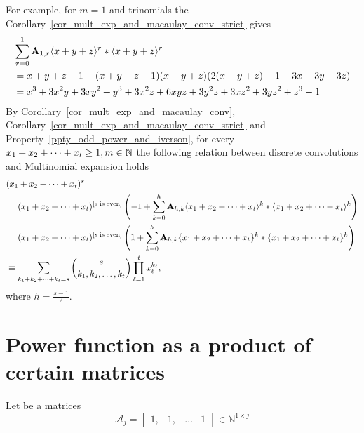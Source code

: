 \documentclass[12pt,letterpaper,oneside,reqno]{amsart}
\newcommand \anglePower [2]{\langle #1 \rangle \sp{#2}}
\newcommand \multifoldSum [2][x]{{#1}\sb{1} + {#1}\sb{2} + \cdots + {#1}\sb{#2}}
\newcommand \curvePower [2]{\{#1\}\sp{#2}}
\newcommand \iversonBracket [1][s]{[#1 \; \mathrm{is} \; \mathrm{even}]}
\newcommand \coeffA [3][A] {{\mathbf{#1}} \sb{#2,#3}}
\numberwithin{equation}{section}
\begin{document}
    For example, for $m=1$ and trinomials the Corollary~\ref{cor_mult_exp_and_macaulay_conv_strict} gives
    \begin{equation*}
        \begin{split}
            &\sum_{r=0}^{1} \coeffA{1}{r} \anglePower{x+y+z}{r} \ast \anglePower{x+y+z}{r} \\
            &=x + y + z -1 - (x + y + z -1) (x + y + z) (2 (x + y + z) - 1 - 3 x - 3 y - 3 z) \\
            &=x^3 + 3 x^2 y + 3 x y^2 + y^3 + 3 x^2 z + 6 x y z + 3 y^2 z + 3 x z^2 + 3 y z^2 + z^3-1
        \end{split}
    \end{equation*}
    By Corollary~\ref{cor_mult_exp_and_macaulay_conv}, Corollary~\ref{cor_mult_exp_and_macaulay_conv_strict}
    and Property~\ref{ppty_odd_power_and_iverson}, for every $\multifoldSum{t} \geq 1, m\in\mathbb{N}$
    the following relation between discrete convolutions and Multinomial expansion holds
    \begin{equation*}
        \begin{split}
            &(\multifoldSum{t})^s \\
            &=(\multifoldSum{t})^{\iversonBracket}
            \left(-1 + \sum_{k=0}^{h} \coeffA{h}{k}
            \anglePower{\multifoldSum{t}}{k} \ast \anglePower{\multifoldSum{t}}{k} \right) \\
            &=(\multifoldSum{t})^{\iversonBracket}
            \left(1 + \sum_{k=0}^{h} \coeffA{h}{k}
            \curvePower{\multifoldSum{t}}{k} \ast \curvePower{\multifoldSum{t}}{k} \right) \\
            &\equiv \sum_{\multifoldSum[k]{t}=s} \binom{s}{k_1, k_2, \ldots, k_t}
            \prod_{\ell=1}^{t} x_{\ell}^{k_\ell},
        \end{split}
    \end{equation*}
    where $h=\frac{s-1}{2}$.


    \section{Power function as a product of certain matrices}
    Let be a matrices
    \begin{equation*}
        \mathcal{A}_{j} =
        \begin{bmatrix}
            1, & 1, & \ldots & 1
        \end{bmatrix}
        \in \mathbb{N}^{1 \times j}
    \end{equation*}
\end{document}
